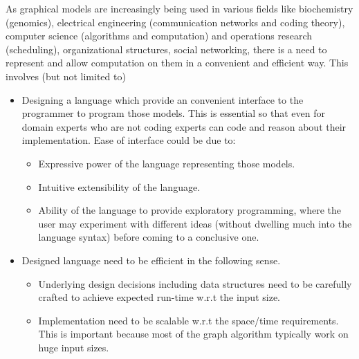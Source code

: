 As graphical models are increasingly being used in various fields like
biochemistry (genomics), electrical engineering (communication networks and
    coding theory), computer science (algorithms and computation) and
operations research (scheduling), organizational structures, social networking,
           there is a need to represent and allow computation on them in a
convenient and efficient way. This involves (but not limited to)

    \begin{itemize} 
    \item Designing a language which provide an convenient
    interface to the programmer to program those models.  This is essential so
    that even for domain experts who are not coding experts can code and reason
    about their implementation.  Ease of interface could be due to:
      \begin{itemize} 
        \item Expressive power of the language representing those
    models.  
        \item Intuitive extensibility of the language.  
        \item Ability of the language to provide exploratory programming, 
        where the user may
    experiment with different ideas (without dwelling much into the language
        syntax) before coming to a conclusive one.  
      \end{itemize} 
    \item
    Designed language need to be efficient in the following sense.
      \begin{itemize} 
        \item Underlying design decisions including data structures
    need to be carefully crafted to achieve expected run-time w.r.t the input
    size.  
        \item Implementation need to be scalable w.r.t the space/time
    requirements. This is important because most of the graph algorithm
    typically work on huge input sizes.  
      \end{itemize} 
    \end{itemize}       


